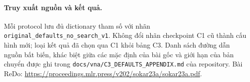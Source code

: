 \paragraph{Truy xuất nguồn và kết quả.}
Mỗi protocol lưu đủ dictionary tham số với nhãn
\texttt{original\_defaults\_no\_search\_v1}. Không đổi nhãn checkpoint
C1 cũ thành cấu hình mới; loại kết quả đã chọn qua C1 khỏi bảng C3.
Danh sách đường dẫn nguồn bất biến, khác biệt giữa các mặc định của
bài gốc và giới hạn của bản chuyển được ghi trong
\texttt{docs/vna/C3\_DEFAULTS\_APPENDIX.md} của repository.
Bài ReDo: \url{https://proceedings.mlr.press/v202/sokar23a/sokar23a.pdf}.
